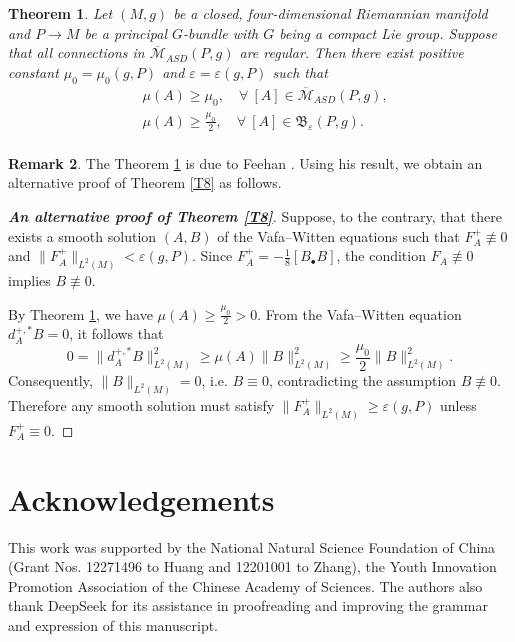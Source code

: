 \documentclass[12pt, twoside]{article}
\newtheorem{theorem}{Theorem}[section]
\theoremstyle{definition}
\newtheorem{remark}[theorem]{Remark}
\numberwithin{equation}{section}
\begin{document}
\begin{theorem}\label{T6}
Let $(M,g)$ be a closed, four-dimensional Riemannian manifold and $P\rightarrow M$ be a principal $G$-bundle with $G$ being a compact Lie group.
 Suppose that all connections in $\overline{\mathcal{M}}_{ASD}(P, g)$ are \textit{regular}.  
 Then there exist  positive constant $\mu_{0}=\mu_{0}(g,P)$ and $\varepsilon=\varepsilon(g,P)$ such that 
\begin{equation*}
\begin{split}
&\mu(A)\geq\mu_{0},\quad \forall ~ [A] \in \overline{\mathcal{M}}_{ASD}(P, g),\\
&\mu(A)\geq\frac{\mu_{0}}{2},\quad \forall ~ [A] \in\mathfrak{B}_{\varepsilon}(P,g).\\
\end{split}
\end{equation*}
\end{theorem}

\begin{remark}
The Theorem \ref{T6} is due to Feehan \cite[Theorems 3.7 and 3.8]{Fee16}. Using his result, we obtain an alternative proof of Theorem \ref{T8} as follows.
\end{remark}

\begin{proof}[\textbf{An alternative proof of Theorem \ref{T8}}]
Suppose, to the contrary, that there exists a smooth solution $(A,B)$ of the Vafa--Witten equations
 such that  $F_{A}^{+} \not\equiv 0$ and $\|F_A^+\|_{L^2(M)} < \varepsilon(g,P)$.
  Since $F_{A}^{+}=-\frac{1}{8}[B_{\bullet} B]$, the condition $F_{A}\not\equiv0$ implies $B\not\equiv0$. 

By Theorem \ref{T6}, we have $\mu(A) \ge \frac{\mu_0}{2} > 0$.  From  the Vafa--Witten equation $d_{A}^{+,\ast}B = 0$, it follows that
\[
0 = \|d_A^{+,\ast} B\|_{L^2(M)}^2\geq \mu(A) \|B\|_{L^2(M)}^2\geq\frac{\mu_{0}}{2}\|B\|_{L^2(M)}^2.
\]
Consequently, $\|B\|_{L^2(M)} = 0$, i.e. $B \equiv 0$, contradicting the assumption $B \not\equiv 0$. Therefore any smooth solution must satisfy $\|F_A^+\|_{L^2(M)} \ge \varepsilon(g,P)$ unless $F_A^+ \equiv 0$.
\end{proof}


	




\section*{Acknowledgements}
This work was supported by the National Natural Science Foundation of China (Grant Nos. 12271496 to Huang and 12201001 to Zhang), 
the Youth Innovation Promotion Association of the Chinese Academy of Sciences.
 The authors also thank DeepSeek for its assistance in proofreading and improving the grammar and expression of this manuscript.
\end{document}
